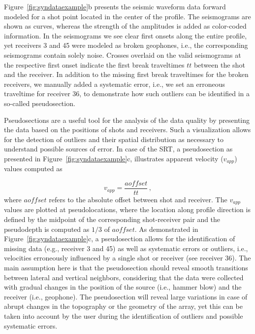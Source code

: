 \documentclass[a4paper,fleqn]{cas-sc}
\begin{document}
Figure~\ref{fig:syndataexample}b presents the seismic waveform data forward modeled for a shot point located in the center of the profile. The seismograms are shown as curves, whereas the strength of the amplitudes is added as color-coded information. In the seismograms we see clear first onsets along the entire profile, yet receivers 3 and 45 were modeled as broken geophones, i.e., the corresponding seismograms contain solely noise. Crosses overlaid on the valid seismograms at the respective first onset indicate the first break traveltimes $tt$ between the shot and the receiver. In addition to the missing first break traveltimes for the broken receivers, we manually added a systematic error, i.e., we set an erroneous traveltime for receiver 36, to demonstrate how such outliers can be identified in a so-called pseudosection.

Pseudosections are a useful tool for the analysis of the data quality by presenting the data based on the positions of shots and receivers. Such a visualization allows for the detection of outliers and their spatial distribution as necessary to understand possible sources of error. In case of the SRT, a pseudosection as presented in Figure~\ref{fig:syndataexample}c, illustrates apparent velocity ($v_{app}$) values computed as

\begin{equation}
	v_{app}=\frac{aoffset}{tt}\,,
	\label{eq:vapp}
\end{equation}
where $aoffset$ refers to the absolute offset between shot and receiver. The $v_{app}$ values are plotted at pseudolocations, where the location along profile direction is defined by the midpoint of the corresponding shot-receiver pair and the pseudodepth is computed as $1/3$ of $aoffset$.
As demonstrated in Figure~\ref{fig:syndataexample}c, a pseudosection allows for the identification of missing data (e.g., receiver 3 and 45) as well as systematic errors or outliers, i.e., velocities erroneously influenced by a single shot or receiver (see receiver 36). The main assumption here is that the pseudosection should reveal smooth transitions between lateral and vertical neighbors, considering that the data were collected with gradual changes in the position of the source (i.e., hammer blow) and the receiver (i.e., geophone). The pseudosection will reveal large variations in case of abrupt changes in the topography or the geometry of the array, yet this can be taken into account by the user during the identification of outliers and possible systematic errors.
\end{document}
